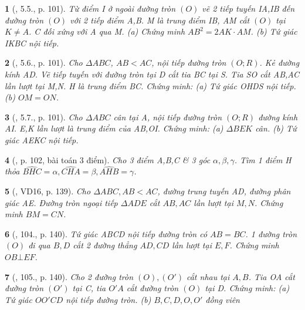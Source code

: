 \documentclass{article}
\newtheorem{baitoan}{}
\begin{document}
\begin{baitoan}[\cite{Binh_boi_duong_Toan_9_tap_2}, 5.5., p. 101]
	Từ điểm I ở ngoài đường tròn $(O)$ vẽ 2 tiếp tuyến IA,IB đến đường tròn $(O)$ với 2 tiếp điểm A,B. M là trung điểm IB, AM cắt $(O)$ tại $K\ne A$. C đối xứng với A qua M. (a) Chứng minh $AB^2 = 2AK\cdot AM$. (b) Tứ giác IKBC nội tiếp.
\end{baitoan}

\begin{baitoan}[\cite{Binh_boi_duong_Toan_9_tap_2}, 5.6., p. 101]
	Cho $\Delta ABC$, $AB < AC$, nội tiếp đường tròn $(O;R)$. Kẻ đường kính AD. Vẽ tiếp tuyến với đường tròn tại D cắt tia BC tại S. Tia SO cắt AB,AC lần lượt tại M,N. H là trung điểm BC. Chứng minh: (a) Tứ giác OHDS nội tiếp. (b) $OM = ON$.
\end{baitoan}

\begin{baitoan}[\cite{Binh_boi_duong_Toan_9_tap_2}, 5.7., p. 101]
	Cho $\Delta ABC$ cân tại A, nội tiếp đường tròn $(O;R)$ đường kính AI. E,K lần lượt là trung điểm của AB,OI. Chứng minh: (a) $\Delta BEK$ cân. (b) Tứ giác AEKC nội tiếp.
\end{baitoan}

\begin{baitoan}[\cite{Binh_boi_duong_Toan_9_tap_2}, p. 102, bài toán 3 điểm]
	Cho 3 điểm A,B,C \& 3 góc $\alpha,\beta,\gamma$. Tìm 1 điểm H thỏa $\widehat{BHC} = \alpha,\widehat{CHA} = \beta,\widehat{AHB} = \gamma$.
\end{baitoan}

\begin{baitoan}[\cite{Tuyen_Toan_9_old}, VD16, p. 139]
	Cho $\Delta ABC,AB < AC$, đường trung tuyến AD, đường phân giác AE. Đường tròn ngoại tiếp $\Delta ADE$ cắt $AB,AC$ lần lượt tại $M,N$. Chứng minh $BM = CN$.
\end{baitoan}

\begin{baitoan}[\cite{Tuyen_Toan_9_old}, 104., p. 140]
	Tứ giác ABCD nội tiếp đường tròn có $AB = BC$. 1 đường tròn $(O)$ đi qua $B,D$ cắt 2 đường thẳng $AD,CD$ lần lượt tại $E,F$. Chứng minh $OB\bot EF$.
\end{baitoan}

\begin{baitoan}[\cite{Tuyen_Toan_9_old}, 105., p. 140]
	Cho 2 đường tròn $(O),(O')$ cắt nhau tại $A,B$. Tia OA cắt đường tròn $(O')$ tại C, tia $O'A$ cắt đường tròn $(O)$ tại D. Chứng minh: (a) Tứ giác $OO'CD$ nội tiếp đường tròn. (b) $B,C,D,O,O'$ đồng viên
\end{baitoan}
\end{document}
